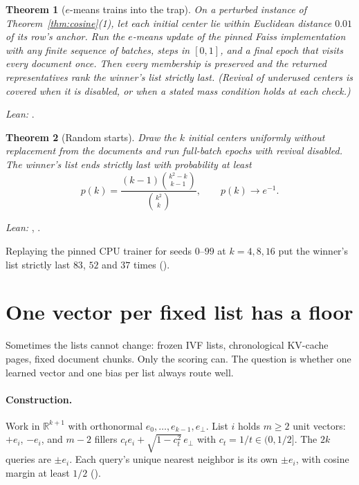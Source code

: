 \documentclass[11pt]{article}
\newtheorem{theorem}{Theorem}
\theoremstyle{definition}
\theoremstyle{remark}
\newcommand{\R}{\mathbb{R}}
\newcommand{\leanline}[1]{{\sloppy\noindent\small\textit{Lean:} #1.\par}\smallskip}
\begin{document}
\begin{theorem}[$e$-means trains into the trap]\label{thm:emeans}
On a perturbed instance of Theorem~\ref{thm:cosine}(1), let each initial center lie within Euclidean distance $0.01$ of its row's anchor. Run the $e$-means update of the pinned Faiss implementation with any finite sequence of batches, steps in $[0,1]$, and a final epoch that visits every document once. Then every membership is preserved and the returned representatives rank the winner's list strictly last. (Revival of underused centers is covered when it is disabled, or when a stated mass condition holds at each check.)
\end{theorem}
\leanline{}

\begin{theorem}[Random starts]\label{thm:random}
Draw the $k$ initial centers uniformly without replacement from the documents and run full-batch epochs with revival disabled. The winner's list ends strictly last with probability at least
\[
p(k) = \frac{(k-1)\binom{k^2-k}{k-1}}{\binom{k^2}{k}}, \qquad p(k)\to e^{-1}.
\]
\end{theorem}
\leanline{, \lean{EMeans.tendsto_seedProbability}}

Replaying the pinned CPU trainer for seeds $0$--$99$ at $k=4,8,16$ put the winner's list strictly last $83$, $52$ and $37$ times ().

\section{One vector per fixed list has a floor}\label{sec:floor}

Sometimes the lists cannot change: frozen IVF lists, chronological KV-cache pages, fixed document chunks. Only the scoring can. The question is whether one learned vector and one bias per list always route well.

\paragraph{Construction.} Work in $\R^{k+1}$ with orthonormal $e_0,\dots,e_{k-1},e_\perp$. List $i$ holds $m\ge2$ unit vectors: $+e_i$, $-e_i$, and $m-2$ fillers $c_te_i+\sqrt{1-c_t^2}\,e_\perp$ with $c_t=1/t\in(0,1/2]$. The $2k$ queries are $\pm e_i$. Each query's unique nearest neighbor is its own $\pm e_i$, with cosine margin at least $1/2$ ().
\end{document}
